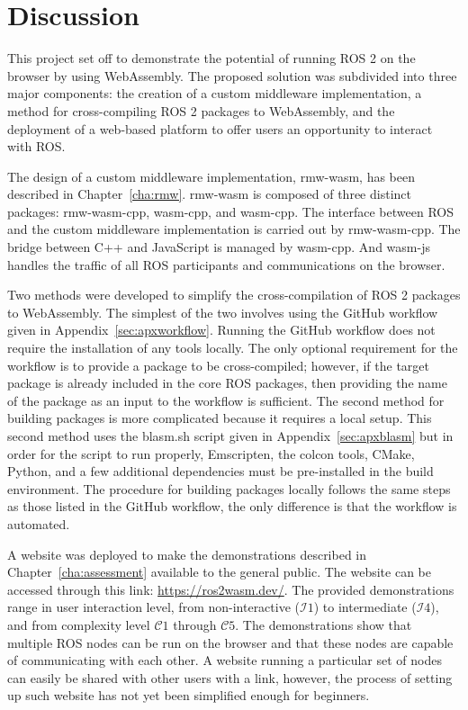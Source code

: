 \chapter{Discussion}

This project set off to demonstrate the potential of running \ac{ROS} 2 on the browser by using WebAssembly. The proposed solution was subdivided into three major components: the creation of a custom middleware implementation, a method for cross-compiling \ac{ROS} 2 packages to WebAssembly, and the deployment of a web-based platform to offer users an opportunity to interact with \ac{ROS}.

The design of a custom middleware implementation, \textsf{rmw-wasm}, has been described in Chapter~\ref{cha:rmw}. \textsf{rmw-wasm} is composed of three distinct packages: \textsf{rmw-wasm-cpp}, \textsf{wasm-cpp}, and \textsf{wasm-cpp}. The interface between \ac{ROS} and the custom middleware implementation is carried out by \textsf{rmw-wasm-cpp}. The bridge between C++ and JavaScript is managed by \textsf{wasm-cpp}. And \textsf{wasm-js} handles the traffic of all \ac{ROS} participants and communications on the browser.

Two methods were developed to simplify the cross-compilation of \ac{ROS} 2 packages to WebAssembly. The simplest of the two involves using the GitHub workflow given in Appendix~\ref{sec:apxworkflow}. Running the GitHub workflow does not require the installation of any tools locally. The only optional requirement for the workflow is to provide a package to be cross-compiled; however, if the target package is already included in the core \ac{ROS} packages, then providing the name of the package as an input to the workflow is sufficient. The second method for building packages is more complicated because it requires a local setup. This second method uses the \textsf{blasm.sh} script given in Appendix~\ref{sec:apxblasm} but in order for the script to run properly, Emscripten, the \textsf{colcon} tools, CMake, Python, and a few additional dependencies must be pre-installed in the build environment. The procedure for building packages locally follows the same steps as those listed in the GitHub workflow, the only difference is that the workflow is automated.

A website was deployed to make the demonstrations described in Chapter~\ref{cha:assessment} available to the general public. The website can be accessed through this link: \href{https://ros2wasm.dev/}{https://ros2wasm.dev/}. The provided demonstrations range in user interaction level, from non-interactive ($\mathcal{I}1$) to intermediate ($\mathcal{I}4$), and from complexity level $\mathcal{C}1$ through $\mathcal{C}5$. The demonstrations show that multiple \ac{ROS} nodes can be run on the browser and that these nodes are capable of communicating with each other. A website running a particular set of nodes can easily be shared with other users with a link, however, the process of setting up such website has not yet been simplified enough for beginners. 

